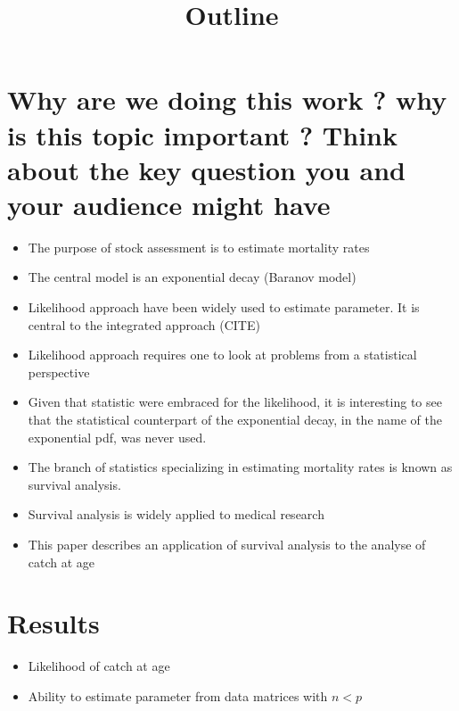 \documentclass[11pt]{article}
\begin{document}
\title{Outline}
\maketitle


\section{Why are we doing this work ? why is this topic important ? Think about the key question you and your audience might have}

\begin{itemize}
\item The purpose of stock assessment is to estimate mortality rates
\item The central model is an exponential decay (Baranov model)
\item Likelihood approach have been widely used to estimate parameter. It is central to the integrated approach (CITE)
\item Likelihood approach requires one to look at problems from a statistical perspective
\item Given that statistic were embraced for the likelihood, it is interesting to see that the statistical counterpart of the exponential decay, in the name of the exponential pdf, was never used. 
\item The branch of statistics specializing in estimating mortality rates is known as survival analysis.
\item Survival analysis is widely applied to medical research

\item This paper describes an application of survival analysis to the analyse of catch at age
\end{itemize}

\section{Results}

\begin{itemize}
\item Likelihood of catch at age
\item Ability to estimate parameter from data matrices with $n < p$ 
\end{itemize}
\end{document}
